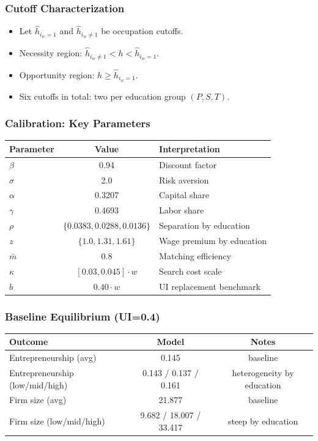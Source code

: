 \documentclass[english,aspectratio=169]{beamer}
\begin{document}
\begin{frame}
\frametitle{Cutoff Characterization}
\begin{itemize}
\item Let $\hat h_{i_w=1}$ and $\hat h_{i_w\neq 1}$ be occupation cutoffs.
\item Necessity region: $\hat h_{i_w\neq 1}<h<\hat h_{i_w=1}$.
\item Opportunity region: $h\geq\hat h_{i_w=1}$.
\item Six cutoffs in total: two per education group $(P,S,T)$.
\end{itemize}
\end{frame}

\begin{frame}
\frametitle{Calibration: Key Parameters}
\begin{center}
\small
\begin{tabular}{lcl}
\hline
Parameter & Value & Interpretation \\
\hline
$\beta$ & 0.94 & Discount factor \\
$\sigma$ & 2.0 & Risk aversion \\
$\alpha$ & 0.3207 & Capital share \\
$\gamma$ & 0.4693 & Labor share \\
$\rho$ & $\{0.0383,0.0288,0.0136\}$ & Separation by education \\
$z$ & $\{1.0,1.31,1.61\}$ & Wage premium by education \\
$\bar m$ & 0.8 & Matching efficiency \\
$\kappa$ & $[0.03,0.045]\cdot w$ & Search cost scale \\
$b$ & $0.40\cdot w$ & UI replacement benchmark \\
\hline
\end{tabular}
\end{center}
\end{frame}

\begin{frame}
\frametitle{Baseline Equilibrium (UI=0.4)}
\begin{center}
\small
\begin{tabular}{lcc}
\hline
Outcome & Model & Notes \\
\hline
Entrepreneurship (avg) & 0.145 & baseline \\
Entrepreneurship (low/mid/high) & 0.143 / 0.137 / 0.161 & heterogeneity by education \\
Firm size (avg) & 21.877 & baseline \\
Firm size (low/mid/high) & 9.682 / 18.007 / 33.417 & steep by education \\
\hline
\end{tabular}
\end{center}
\end{frame}
\end{document}
